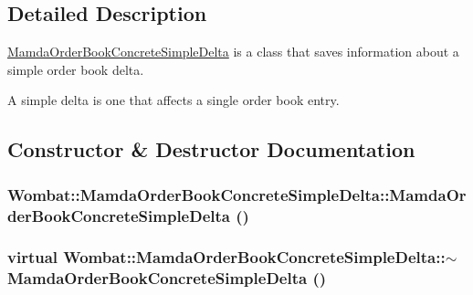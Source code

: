 \subsection{Detailed Description}
\hyperlink{classWombat_1_1MamdaOrderBookConcreteSimpleDelta}{Mamda\-Order\-Book\-Concrete\-Simple\-Delta} is a class that saves information about a simple order book delta. 

A simple delta is one that affects a single order book entry. 



\subsection{Constructor \& Destructor Documentation}
\hypertarget{classWombat_1_1MamdaOrderBookConcreteSimpleDelta_fda301bf680626128766a84eab9bd680}{
\subsubsection[MamdaOrderBookConcreteSimpleDelta]{\setlength{\rightskip}{0pt plus 5cm}Wombat::Mamda\-Order\-Book\-Concrete\-Simple\-Delta::Mamda\-Order\-Book\-Concrete\-Simple\-Delta ()}}
\label{classWombat_1_1MamdaOrderBookConcreteSimpleDelta_fda301bf680626128766a84eab9bd680}


\hypertarget{classWombat_1_1MamdaOrderBookConcreteSimpleDelta_aaeb5af7e63b8d3915dce1b07c958cf6}{
\subsubsection[$\sim$MamdaOrderBookConcreteSimpleDelta]{\setlength{\rightskip}{0pt plus 5cm}virtual Wombat::Mamda\-Order\-Book\-Concrete\-Simple\-Delta::$\sim$Mamda\-Order\-Book\-Concrete\-Simple\-Delta ()}}
\label{classWombat_1_1MamdaOrderBookConcreteSimpleDelta_aaeb5af7e63b8d3915dce1b07c958cf6}




